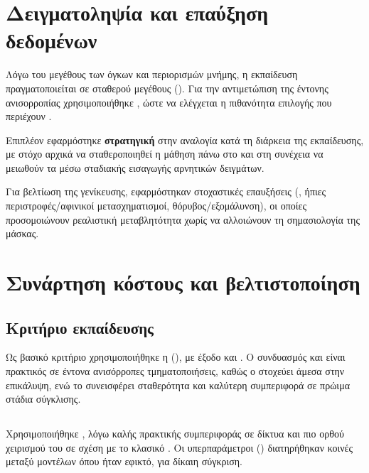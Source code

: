 \section{Δειγματοληψία  και επαύξηση δεδομένων}
\label{sec:proto_patches_aug}

Λόγω του μεγέθους των  όγκων και περιορισμών μνήμης, η εκπαίδευση
πραγματοποιείται σε  σταθερού μεγέθους ().
Για την αντιμετώπιση της έντονης ανισορροπίας 
χρησιμοποιήθηκε , ώστε να ελέγχεται η πιθανότητα
επιλογής  που περιέχουν .

Επιπλέον εφαρμόστηκε \textbf{στρατηγική } στην αναλογία
 κατά τη διάρκεια της εκπαίδευσης, με στόχο αρχικά να
σταθεροποιηθεί η μάθηση πάνω στο  και στη συνέχεια να
μειωθούν τα  μέσω σταδιακής εισαγωγής αρνητικών
δειγμάτων.

Για βελτίωση της γενίκευσης, εφαρμόστηκαν στοχαστικές επαυξήσεις
(, ήπιες περιστροφές/αφινικοί μετασχηματισμοί, 
θόρυβος/εξομάλυνση), οι οποίες προσομοιώνουν ρεαλιστική μεταβλητότητα χωρίς
να αλλοιώνουν τη σημασιολογία της μάσκας.

\section{Συνάρτηση κόστους και βελτιστοποίηση}
\label{sec:proto_optim}

\subsection{Κριτήριο εκπαίδευσης}
Ως βασικό κριτήριο χρησιμοποιήθηκε η  (),
με  έξοδο και . Ο συνδυασμός
 και  είναι πρακτικός σε έντονα ανισόρροπες τμηματοποιήσεις,
καθώς ο  στοχεύει άμεσα στην επικάλυψη, ενώ το  συνεισφέρει
σταθερότητα και καλύτερη συμπεριφορά  σε πρώιμα στάδια σύγκλισης.

\subsection{}
Χρησιμοποιήθηκε  \cite{loshchilov2019adamw}, λόγω καλής πρακτικής
συμπεριφοράς σε  δίκτυα και πιο ορθού χειρισμού του 
σε σχέση με το κλασικό . Οι υπερπαράμετροι () διατηρήθηκαν κοινές μεταξύ μοντέλων όπου ήταν εφικτό, για δίκαιη
σύγκριση.

